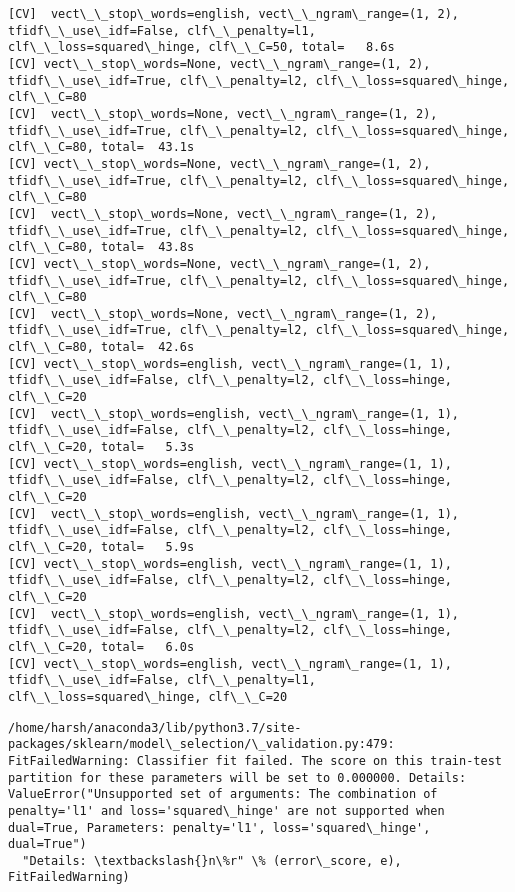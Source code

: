 \documentclass[11pt]{article}
\begin{document}
    \begin{Verbatim}[commandchars=\\\{\}]
[CV]  vect\_\_stop\_words=english, vect\_\_ngram\_range=(1, 2), tfidf\_\_use\_idf=False, clf\_\_penalty=l1, clf\_\_loss=squared\_hinge, clf\_\_C=50, total=   8.6s
[CV] vect\_\_stop\_words=None, vect\_\_ngram\_range=(1, 2), tfidf\_\_use\_idf=True, clf\_\_penalty=l2, clf\_\_loss=squared\_hinge, clf\_\_C=80 
[CV]  vect\_\_stop\_words=None, vect\_\_ngram\_range=(1, 2), tfidf\_\_use\_idf=True, clf\_\_penalty=l2, clf\_\_loss=squared\_hinge, clf\_\_C=80, total=  43.1s
[CV] vect\_\_stop\_words=None, vect\_\_ngram\_range=(1, 2), tfidf\_\_use\_idf=True, clf\_\_penalty=l2, clf\_\_loss=squared\_hinge, clf\_\_C=80 
[CV]  vect\_\_stop\_words=None, vect\_\_ngram\_range=(1, 2), tfidf\_\_use\_idf=True, clf\_\_penalty=l2, clf\_\_loss=squared\_hinge, clf\_\_C=80, total=  43.8s
[CV] vect\_\_stop\_words=None, vect\_\_ngram\_range=(1, 2), tfidf\_\_use\_idf=True, clf\_\_penalty=l2, clf\_\_loss=squared\_hinge, clf\_\_C=80 
[CV]  vect\_\_stop\_words=None, vect\_\_ngram\_range=(1, 2), tfidf\_\_use\_idf=True, clf\_\_penalty=l2, clf\_\_loss=squared\_hinge, clf\_\_C=80, total=  42.6s
[CV] vect\_\_stop\_words=english, vect\_\_ngram\_range=(1, 1), tfidf\_\_use\_idf=False, clf\_\_penalty=l2, clf\_\_loss=hinge, clf\_\_C=20 
[CV]  vect\_\_stop\_words=english, vect\_\_ngram\_range=(1, 1), tfidf\_\_use\_idf=False, clf\_\_penalty=l2, clf\_\_loss=hinge, clf\_\_C=20, total=   5.3s
[CV] vect\_\_stop\_words=english, vect\_\_ngram\_range=(1, 1), tfidf\_\_use\_idf=False, clf\_\_penalty=l2, clf\_\_loss=hinge, clf\_\_C=20 
[CV]  vect\_\_stop\_words=english, vect\_\_ngram\_range=(1, 1), tfidf\_\_use\_idf=False, clf\_\_penalty=l2, clf\_\_loss=hinge, clf\_\_C=20, total=   5.9s
[CV] vect\_\_stop\_words=english, vect\_\_ngram\_range=(1, 1), tfidf\_\_use\_idf=False, clf\_\_penalty=l2, clf\_\_loss=hinge, clf\_\_C=20 
[CV]  vect\_\_stop\_words=english, vect\_\_ngram\_range=(1, 1), tfidf\_\_use\_idf=False, clf\_\_penalty=l2, clf\_\_loss=hinge, clf\_\_C=20, total=   6.0s
[CV] vect\_\_stop\_words=english, vect\_\_ngram\_range=(1, 1), tfidf\_\_use\_idf=False, clf\_\_penalty=l1, clf\_\_loss=squared\_hinge, clf\_\_C=20 

    \end{Verbatim}

    \begin{Verbatim}[commandchars=\\\{\}]
/home/harsh/anaconda3/lib/python3.7/site-packages/sklearn/model\_selection/\_validation.py:479: FitFailedWarning: Classifier fit failed. The score on this train-test partition for these parameters will be set to 0.000000. Details: 
ValueError("Unsupported set of arguments: The combination of penalty='l1' and loss='squared\_hinge' are not supported when dual=True, Parameters: penalty='l1', loss='squared\_hinge', dual=True")
  "Details: \textbackslash{}n\%r" \% (error\_score, e), FitFailedWarning)

    \end{Verbatim}
\end{document}

